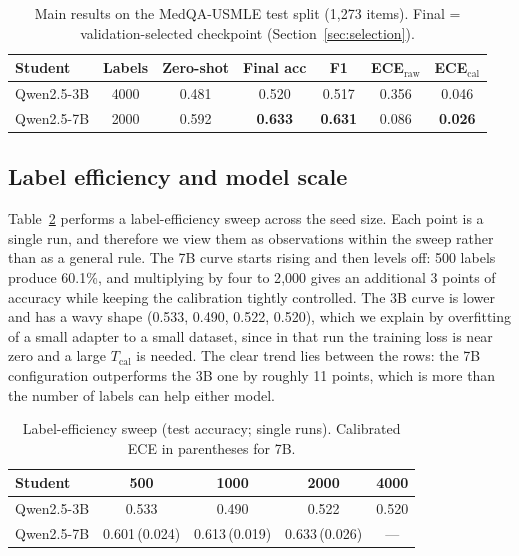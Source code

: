 \documentclass[conference]{IEEEtran}
\begin{document}
\begin{table}[tb]
\caption{Main results on the MedQA-USMLE test split (1{,}273 items). Final = validation-selected checkpoint (Section~\ref{sec:selection}).}\label{tab:main}
\centering
\small
\setlength{\tabcolsep}{3.5pt}
\begin{tabular}{@{}lcccccc@{}}
\toprule
Student & Labels & Zero-shot & Final acc & F1 & ECE$_\text{raw}$ & ECE$_\text{cal}$ \\
\midrule
Qwen2.5-3B & 4000 & 0.481 & 0.520 & 0.517 & 0.356 & 0.046 \\
Qwen2.5-7B & 2000 & 0.592 & \textbf{0.633} & \textbf{0.631} & 0.086 & \textbf{0.026} \\
\bottomrule
\end{tabular}
\end{table}

\subsection{Label efficiency and model scale}
Table~\ref{tab:eff} performs a label-efficiency sweep across the seed size. Each point is a single run, and therefore we view them as observations within the sweep rather than as a general rule. The 7B curve starts rising and then levels off: 500 labels produce 60.1\%, and multiplying by four to 2{,}000 gives an additional 3 points of accuracy while keeping the calibration tightly controlled. The 3B curve is lower and has a wavy shape (0.533, 0.490, 0.522, 0.520), which we explain by overfitting of a small adapter to a small dataset, since in that run the training loss is near zero and a large $T_{\text{cal}}$ is needed. The clear trend lies between the rows: the 7B configuration outperforms the 3B one by roughly 11 points, which is more than the number of labels can help either model.

\begin{table}[tb]
\caption{Label-efficiency sweep (test accuracy; single runs). Calibrated ECE in parentheses for 7B.}\label{tab:eff}
\centering
\small
\setlength{\tabcolsep}{3pt}
\begin{tabular}{@{}lcccc@{}}
\toprule
Student & 500 & 1000 & 2000 & 4000 \\
\midrule
Qwen2.5-3B & 0.533 & 0.490 & 0.522 & 0.520 \\
Qwen2.5-7B & 0.601\,(0.024) & 0.613\,(0.019) & 0.633\,(0.026) & --- \\
\bottomrule
\end{tabular}
\end{table}
\end{document}
